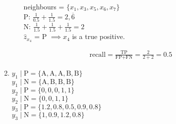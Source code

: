\documentclass[12pt,a4paper]{article}
\newcommand{\subscript}[2]{$#1 _ #2$}
\begin{document}
\begin{enumerate}
\begin{enumerate}[label=\subscript{x}{{\arabic*}})]
		            \vspace{5px}

		            neighbours = $\{x_1, x_3, x_5, x_6, x_7\}$ \\
		            P: $\frac{1}{0.5} + \frac{1}{1.5} = 2,\overline{6}$ \\
		            N: $\frac{1}{1.5} + \frac{1}{1.5} + \frac{1}{1.5} = 2$ \\
		            $\hat{z}_{x_4}$ = P $\implies x_4$ is a true positive.

	      \end{enumerate}

	      \begin{gather*}
		      \text{recall} = \frac{\text{TP}}{\text{FP} + \text{FN}} = \frac{2}{2+2} = 0.5
	      \end{gather*}

	      \pagebreak

	\item
	      $y_1 \mid \text{P} = \{\text{A}, \text{A}, \text{A}, \text{B}, \text{B}\}$\\
	      $y_1 \mid \text{N} = \{\text{A}, \text{B}, \text{B}, \text{B}\}$\\
	      $y_2 \mid \text{P} = \{0, 0, 0, 1, 1\}$\\
	      $y_2 \mid \text{N} = \{0, 0, 1, 1\}$\\
	      $y_3 \mid \text{P} = \{1.2, 0.8, 0.5, 0.9, 0.8\}$ \\
	      $y_3 \mid \text{N} = \{1, 0.9, 1.2, 0.8\}$


\end{enumerate}
\end{document}
